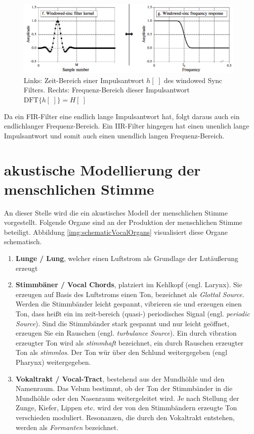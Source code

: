 \begin{figure}[h]
	\centering
	\includegraphics[width=1\textwidth]{bilder/lowPassFilter.png}
	\caption{Links: Zeit-Bereich einer Impulsantwort $h[\;]$ des \glqq windowed Sync Filters\grqq. Rechts: Frequenz-Bereich dieser Impulsantwort $\text{DFT}\{h[\;]\} = H[\;]$ \cite[S. 287]{dspGuide}}
	\label{img:kernelFreq}
\end{figure}

Da ein FIR-Filter eine endlich lange Impulsantwort hat, folgt daraus auch ein endlichlanger Frequenz-Bereich. Ein IIR-Filter hingegen hat einen unenlich lange Impulsantwort und somit auch einen unendlich langen Frequenz-Bereich.

\section{akustische Modellierung der menschlichen Stimme}
\label{sec:theVoice}

An dieser Stelle wird die ein akustisches Modell der menschlichen Stimme vorgestellt. Folgende Organe sind an der Produktion der menschlichen Stimme beteiligt. Abbildung \ref{img:schematicVocalOrgans} visualisiert diese Organe schematisch.

\begin{enumerate}
	\item \textbf{Lunge / Lung}, welcher einen Luftstrom als Grundlage der Lutäußerung erzeugt
	\item \textbf{Stimmbäner / Vocal Chords}, platziert im Kehlkopf (engl. Larynx). Sie erzeugen auf Basis des Luftstroms einen Ton, bezeichnet als \emph{Glottal Source}. Werden die Stimmbänder leicht gespannt, vibrieren sie und erzeugen einen Ton, dass heißt ein im zeit-bereich (quasi-) periodisches Signal (engl. \emph{periodic Source}). Sind die Stimmbänder stark gespannt und nur leicht geöffnet, erzeugen Sie ein Rauschen (engl. \emph{turbulance Source}). Ein durch vibration erzeugter Ton wird als \emph{stimmhaft} bezeichnet, ein durch Rauschen erzeugter Ton als \emph{stimmlos}. Der Ton wür über den Schlund weitergegeben (engl Pharynx) weitergegeben. 
	\item  \textbf{Vokaltrakt / Vocal-Tract}, bestehend aus der Mundhöhle und den Namenraum. Das Velum bestimmt, ob der Ton der Stimmbänder in die Mundhöhle oder den Nasenraum weitergeleitet wird. Je nach Stellung der Zunge, Kiefer, Lippen etc. wird der von den Stimmbändern erzeugte Ton verschieden moduliert. Resonanzen, die durch den Vokaltrakt entstehen, werden als \emph{Formanten} bezeichnet. \cite[S. 62]{cryModel} \cite{speechProduction}
\end{enumerate}
	
